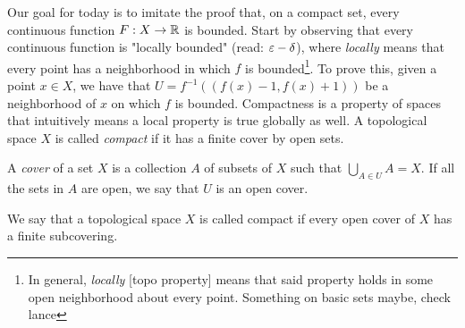\noindent Our goal for today is to imitate the proof that, on a compact set, every continuous function $F : X \to \mathbb R$ is bounded. Start by observing that every continuous function is "locally bounded" (read: $\varepsilon-\delta$), where \textit{locally} means that every point has a neighborhood in which $f$ is bounded\footnote{In general, \textit{locally} [topo property] means that said property holds in some open neighborhood about every point. Something on basic sets maybe, check lance}.
\medskip\newline
To prove this, given a point $x \in X$, we have that $U = f^{-1}((f(x) - 1, f(x) + 1))$ be a neighborhood of $x$ on which $f$ is bounded. Compactness is a property of spaces that intuitively means a local property is true globally as well. A topological space $X$ is called \textit{compact} if it has a finite cover by open sets.
\begin{definition}
    A \textit{cover} of a set $X$ is a collection $A$ of subsets of $X$ such that $\bigcup_{A \in U} A = X$. If all the sets in $A$ are open, we say that $U$ is an open cover.
\end{definition}
\noindent We say that a topological space $X$ is called compact if every open cover of $X$ has a finite subcovering.

